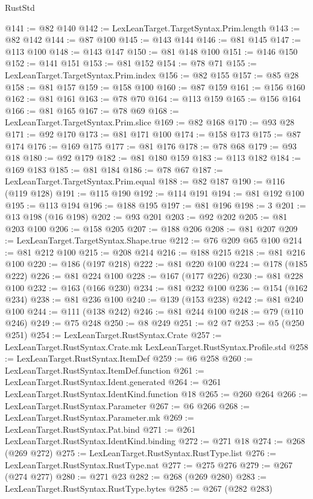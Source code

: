 \begin{lexlean}{RustStd}
\begin{coremodule}
@141 := @82 @140
@142 := LexLeanTarget.TargetSyntax.Prim.length
@143 := @82 @142
@144 := @87 @100
@145 := @143 @144
@146 := @81 @145
@147 := @113 @100
@148 := @143 @147
@150 := @81 @148 @100
@151 := @146 @150
@152 := @141 @151
@153 := @81 @152
@154 := @78 @71
@155 := LexLeanTarget.TargetSyntax.Prim.index
@156 := @82 @155
@157 := @85 @28
@158 := @81 @157
@159 := @158 @100
@160 := @87 @159
@161 := @156 @160
@162 := @81 @161
@163 := @78 @70
@164 := @113 @159
@165 := @156 @164
@166 := @81 @165
@167 := @78 @69
@168 := LexLeanTarget.TargetSyntax.Prim.slice
@169 := @82 @168
@170 := @93 @28
@171 := @92 @170
@173 := @81 @171 @100
@174 := @158 @173
@175 := @87 @174
@176 := @169 @175
@177 := @81 @176
@178 := @78 @68
@179 := @93 @18
@180 := @92 @179
@182 := @81 @180 @159
@183 := @113 @182
@184 := @169 @183
@185 := @81 @184
@186 := @78 @67
@187 := LexLeanTarget.TargetSyntax.Prim.equal
@188 := @82 @187
@190 := @116 (@119 @128)
@191 := @115 @190
@192 := @114 @191
@194 := @81 @192 @100
@195 := @113 @194
@196 := @188 @195
@197 := @81 @196
@198 := 3
@201 := @13 @198 (@16 @198)
@202 := @93 @201
@203 := @92 @202
@205 := @81 @203 @100
@206 := @158 @205
@207 := @188 @206
@208 := @81 @207
@209 := LexLeanTarget.TargetSyntax.Shape.true
@212 := @76 @209 @65 @100
@214 := @81 @212 @100
@215 := @208 @214
@216 := @188 @215
@218 := @81 @216 @100
@220 := @186 (@197 @218)
@222 := @81 @220 @100
@224 := @178 (@185 @222)
@226 := @81 @224 @100
@228 := @167 (@177 @226)
@230 := @81 @228 @100
@232 := @163 (@166 @230)
@234 := @81 @232 @100
@236 := @154 (@162 @234)
@238 := @81 @236 @100
@240 := @139 (@153 @238)
@242 := @81 @240 @100
@244 := @111 (@138 @242)
@246 := @81 @244 @100
@248 := @79 (@110 @246)
@249 := @75 @248
@250 := @8 @249
@251 := @2 @7
@253 := @5 (@250 @251)
@254 := LexLeanTarget.RustSyntax.Crate
@257 := LexLeanTarget.RustSyntax.Crate.mk LexLeanTarget.RustSyntax.Profile.std
@258 := LexLeanTarget.RustSyntax.ItemDef
@259 := @6 @258
@260 := LexLeanTarget.RustSyntax.ItemDef.function
@261 := LexLeanTarget.RustSyntax.Ident.generated
@264 := @261 LexLeanTarget.RustSyntax.IdentKind.function @18
@265 := @260 @264
@266 := LexLeanTarget.RustSyntax.Parameter
@267 := @6 @266
@268 := LexLeanTarget.RustSyntax.Parameter.mk
@269 := LexLeanTarget.RustSyntax.Pat.bind
@271 := @261 LexLeanTarget.RustSyntax.IdentKind.binding
@272 := @271 @18
@274 := @268 (@269 @272)
@275 := LexLeanTarget.RustSyntax.RustType.list
@276 := LexLeanTarget.RustSyntax.RustType.nat
@277 := @275 @276
@279 := @267 (@274 @277)
@280 := @271 @23
@282 := @268 (@269 @280)
@283 := LexLeanTarget.RustSyntax.RustType.bytes
@285 := @267 (@282 @283)

\end{coremodule}
\end{lexlean}
